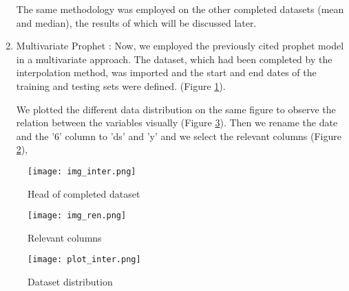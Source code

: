 \documentclass[10pt]{article}
\begin{document}
\begin{multicols}{2}
\begin{enumerate}
The same methodology was employed on the other completed datasets (mean and median), the results of which will be discussed later.

\item Multivariate Prophet : Now, we employed the previously cited prophet model in a multivariate approach.\newline
The dataset, which had been completed by the interpolation method, was imported and the start and end dates of the training and testing sets were defined. (Figure \ref{f19}).

We plotted the different data distribution on the same figure to observe the relation between the variables visually (Figure \ref{f20}).\newline
 Then we rename the date and the '6' column to 'ds' and 'y' and we select the relevant columns (Figure \ref{f21}),

\end{enumerate}

\begin{figure}[H]
\centering
\texttt{[image: img\_inter.png]}
\caption{Head of completed dataset }
\label{f19}
\end{figure}

\begin{figure}[H]
\centering
\texttt{[image: img\_ren.png]}
\caption{Relevant columns}
\label{f21}
\end{figure}

\end{multicols}


\begin{figure}[h!]
\centering
\texttt{[image: plot\_inter.png]}
\caption{Dataset distribution}
\label{f20}
\end{figure}
\end{document}
